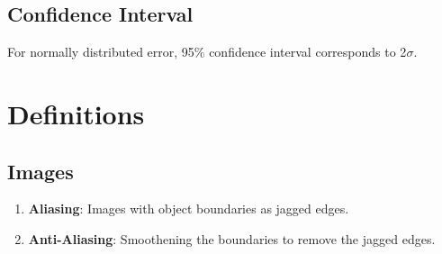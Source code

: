 \documentclass[a4paper, 12pt]{report}
\begin{document}
\section{Confidence Interval}
For normally distributed error, 95\% confidence interval corresponds to 2$\sigma$.

\chapter{Definitions}

\section{Images}
\begin{enumerate}

\item \textbf{Aliasing}: Images with object boundaries as jagged edges. 
\item \textbf{Anti-Aliasing}: Smoothening the boundaries to remove the jagged edges.

\end{enumerate}
\end{document}
